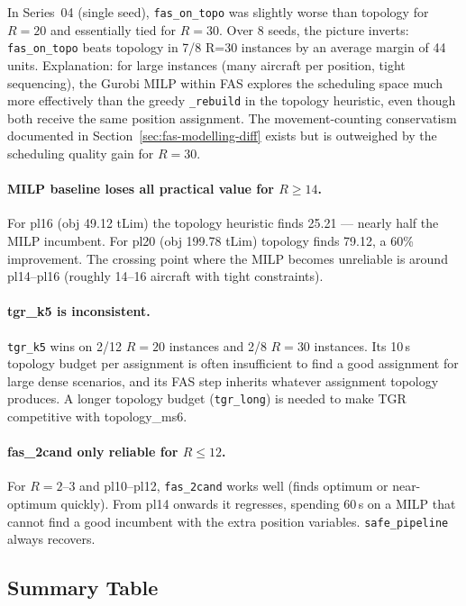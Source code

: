 In Series~04 (single seed), \texttt{fas\_on\_topo} was slightly worse than
topology for $R=20$ and essentially tied for $R=30$.  Over 8 seeds, the
picture inverts: \texttt{fas\_on\_topo} beats topology in 7/8 R=30 instances
by an average margin of 44 units.  Explanation: for large instances (many
aircraft per position, tight sequencing), the Gurobi MILP within FAS explores
the scheduling space much more effectively than the greedy \texttt{\_rebuild}
in the topology heuristic, even though both receive the same position assignment.
The movement-counting conservatism documented in Section~\ref{sec:fas-modelling-diff}
exists but is outweighed by the scheduling quality gain for $R=30$.

\paragraph{MILP baseline loses all practical value for $R\geq 14$.}

For pl16 (obj 49.12 tLim) the topology heuristic finds 25.21 — nearly half the
MILP incumbent.  For pl20 (obj 199.78 tLim) topology finds 79.12, a 60\%
improvement.  The crossing point where the MILP becomes unreliable is around
pl14--pl16 (roughly 14–16 aircraft with tight constraints).

\paragraph{tgr\_k5 is inconsistent.}

\texttt{tgr\_k5} wins on 2/12 $R=20$ instances and 2/8 $R=30$ instances.
Its 10\,s topology budget per assignment is often insufficient to find a good
assignment for large dense scenarios, and its FAS step inherits whatever
assignment topology produces.  A longer topology budget (\texttt{tgr\_long})
is needed to make TGR competitive with topology\_ms6.

\paragraph{fas\_2cand only reliable for $R\leq 12$.}

For $R=2$--$3$ and pl10--pl12, \texttt{fas\_2cand} works well (finds optimum
or near-optimum quickly).  From pl14 onwards it regresses, spending 60\,s
on a MILP that cannot find a good incumbent with the extra position variables.
\texttt{safe\_pipeline} always recovers.

\subsection{Summary Table}

